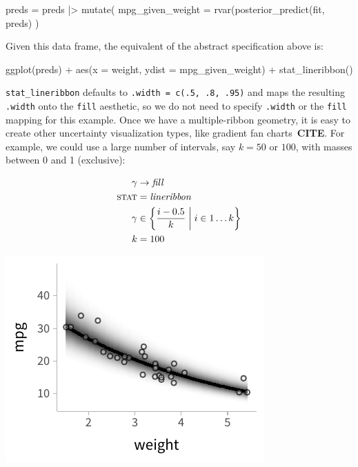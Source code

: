 \documentclass[journal]{vgtc}                     %
\newenvironment{centerverbatim}{%
  \hfill\break
  \small
  \centering
  \varwidth{\linewidth}%
  \verbatim
}{%
  \endverbatim
  \endvarwidth
  \par
  \hfill\break
}
\begin{document}
\begin{centerverbatim}
preds = preds |> mutate(
  mpg_given_weight = rvar(posterior_predict(fit, preds)
)
\end{centerverbatim}

Given this data frame, the equivalent of the abstract specification above is:

\begin{centerverbatim}
ggplot(preds) +
  aes(x = weight, ydist = mpg_given_weight) +
  stat_lineribbon()
\end{centerverbatim}

\texttt{stat\_lineribbon} defaults to \texttt{.width = c(.5, .8, .95)} and maps the resulting \texttt{.width} onto the \texttt{fill} aesthetic, so we do not need to specify \texttt{.width} or the \texttt{fill} mapping for this example. Once we have a multiple-ribbon geometry, it is easy to create other uncertainty visualization types, like gradient fan charts~\textbf{CITE}. For example, we could use a large number of intervals, say $k = 50$ or $100$, with masses between 0 and 1 (exclusive):

\noindent
\begin{minipage}{.5\columnwidth}

\begin{align*}
\gamma &\rightarrow \mathit{fill}\\
\textsc{stat} &= \mathit{lineribbon}\\
\gamma &\in \left\{\frac{i - 0.5}{k} \mathrel{}\middle|\mathrel{} i \in 1 \dots k \right\}\\
k &= 100
\end{align*}
\end{minipage}%
  \begin{minipage}{.4\columnwidth}
    \centering
    \includegraphics[width=1.2\columnwidth]{figs/3-lineribbon_fan.pdf}
  \end{minipage}
\hfill\break
\end{document}
